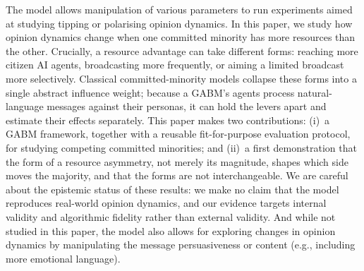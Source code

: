 \documentclass[pdflatex,sn-mathphys-num]{sn-jnl}%
\theoremstyle{thmstyleone}%
\theoremstyle{thmstyletwo}%
\theoremstyle{thmstylethree}%
\begin{document}
The model allows manipulation of various parameters to run experiments aimed at studying
tipping or polarising opinion dynamics. In this paper, we study how opinion dynamics
change when one committed minority has more resources than the other. Crucially, a
resource advantage can take different forms: reaching more citizen AI agents,
broadcasting more frequently, or aiming a limited broadcast more selectively. Classical
committed-minority models collapse these forms into a single abstract influence weight;
because a GABM's agents process natural-language messages against their personas, it can
hold the levers apart and estimate their effects separately. This paper makes two
contributions: (i)~a GABM framework, together with a reusable fit-for-purpose evaluation
protocol, for studying competing committed minorities; and (ii)~a first demonstration
that the form of a resource asymmetry, not merely its magnitude, shapes which
side moves the majority, and that the forms are not interchangeable. We are careful
about the epistemic status of these results: we make no claim that the model reproduces
real-world opinion dynamics, and our evidence targets internal validity and algorithmic
fidelity rather than external validity. And while not studied in this paper, the model
also allows for exploring changes in opinion dynamics by manipulating the message
persuasiveness or content (e.g., including more emotional language).


\end{document}

